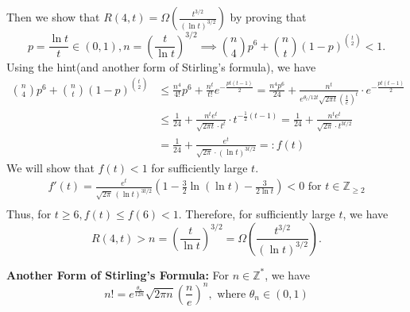 \begin{answer}
    Then we show that $R(4,t) = \Omega\left(\frac{t^{3/2}}{(\ln t)^{3/2}}\right)$ by proving that
    \[
        p = \frac{\ln t}{t}\in (0,1), n = \left(\frac{t}{\ln t}\right)^{3/2} \implies \binom{n}{4}p^{6}+\binom{n}{t}(1-p)^{\binom{t}{2}}<1. 
    \]
    Using the hint(and another form of Stirling's formula), we have 
    \begin{align*}
        \binom{n}{4}p^{6}+\binom{n}{t}(1-p)^{\binom{t}{2}} & \le \frac{n^4}{4!} p^6 + \frac{n^t}{t!} e^{- \frac{pt(t-1)}{2}} = \frac{n^4 p^6}{24} + \frac{n^t}{e^{\theta_t/12t}\sqrt{2\pi t}\left(\frac{t}{e}\right)^t} \cdot e^{-\frac{pt(t-1)}{2}} \\
        &\le \frac{1}{24} + \frac{n^t e^t}{\sqrt{2\pi t}\cdot t^t} \cdot t^{-\frac{1}{2} (t-1)} = \frac{1}{24} + \frac{n^t e^t}{\sqrt{2\pi} \cdot t^{3t/2}} \\
        &= \frac{1}{24} + \frac{e^t}{\sqrt{2\pi}\cdot (\ln t)^{3t/2}} =: f(t)
    \end{align*}
    We will show that $f(t) < 1$ for sufficiently large $t$.
    \begin{align*}
        f'(t) = \frac{e^t}{\sqrt{2\pi} \, (\ln t)^{3t/2}} \left(1 - \frac{3}{2} \ln(\ln t) - \frac{3}{2 \ln t}\right) < 0 \text{ for } t \in \mathbb{Z}_{\ge 2} \\
    \end{align*}
    Thus, for $t \ge 6, f(t) \le f(6) < 1$. Therefore, for sufficiently large $t$, we have
    \[
        R(4,t) > n = \left(\frac{t}{\ln t}\right)^{3/2} = \Omega\left(\frac{t^{3/2}}{(\ln t)^{3/2}}\right).
    \]

    \textbf{Another Form of Stirling's Formula:} For $n \in \mathbb{Z}^*$, we have
    \[
        n! = e^{\frac{\theta_n}{12n}} \sqrt{2\pi n} \left(\frac{n}{e}\right)^n, \text{ where } \theta_n \in (0,1)
    \] 
    \ed
\end{answer}